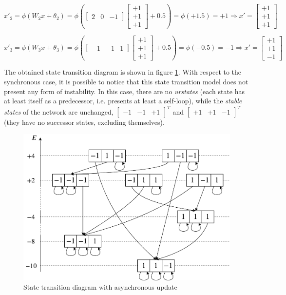 \documentclass[letterpaper,headings=standardclasses]{scrartcl}
\begin{document}
\begin{itemize}
$$ x'_{2} = \phi(W_2 x + \theta_2) = \phi \left( \left[ \begin{matrix} 2 & 0 & -1 \end{matrix} \right] \left[ \begin{matrix} +1 \\ +1 \\ +1 \end{matrix} \right] + 0.5 \right) = \phi \left( +1.5 \right) = +1 \Rightarrow x' = \left[ \begin{matrix} +1 \\ +1 \\ +1 \end{matrix} \right] $$

$$ x'_{3} = \phi(W_3 x + \theta_3) = \phi \left( \left[ \begin{matrix} -1 & -1 & 1 \end{matrix} \right] \left[ \begin{matrix} +1 \\ +1 \\ +1 \end{matrix} \right] + 0.5 \right) = \phi \left( -0.5 \right) = -1 \Rightarrow x' = \left[ \begin{matrix} +1 \\ +1 \\ -1 \end{matrix} \right] $$
\end{itemize}

The obtained state transition diagram is shown in figure \ref{async}. With respect to the synchronous case, it is possible to notice that this state transition model does not present any form of instability. In this case, there are no \emph{urstates} (each state has at least itself as a predecessor, i.e. presents at least a self-loop), while the \emph{stable states} of the network are unchanged, $[\begin{matrix} -1 & -1 & +1 \end{matrix}]^T$ and $[\begin{matrix} +1 & +1 & -1 \end{matrix}]^T$ (they have no successor states, excluding themselves).

\begin{figure}[h]
    \centering
    \includegraphics[width=0.7\linewidth]{async.pdf}
    \caption{State transition diagram with asynchronous update}
    \label{async}
\end{figure}
\end{document}
